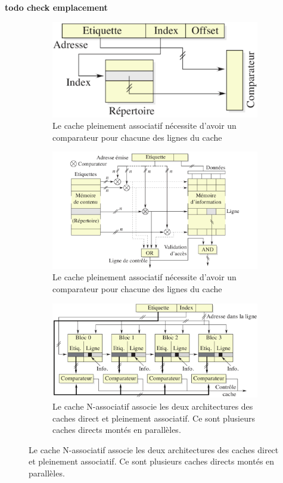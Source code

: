        
       
        \iffalse
            \textbf{todo check emplacement}
            \begin{figure}
                \begin{subfigure}[t]{0.99\linewidth}\centering
                    \includegraphics[width=0.7\linewidth, trim = 0cm 10cm 0cm 2cm]{images/cache_circuit-direct.png}
                    \caption{Le cache pleinement associatif nécessite d'avoir un comparateur pour chacune des lignes du cache}
                    \label{pic:cache_circuit-direct}
                    \vspace{1cm}
                \end{subfigure}
                
                \begin{subfigure}[t]{\linewidth}\centering
                    \includegraphics[width=0.7\linewidth]{images/cache_circuit-fully-associative.png}
                    \caption{Le cache pleinement associatif nécessite d'avoir un comparateur pour chacune des lignes du cache}
                    \label{pic:cache_circuit-fully-associative}
                    \vspace{.5cm}
                \end{subfigure}
                
                \begin{subfigure}[t]{\linewidth}\centering
                    \includegraphics[width=0.7\linewidth]{images/cache_circuit-set-associative.png}
                    \caption{Le cache N-associatif associe les deux architectures des caches direct et pleinement associatif. Ce sont plusieurs caches directs montés en parallèles.}
                    \label{pic:cache_circuit-set-associative}
                \end{subfigure}
                

\end{figure}
